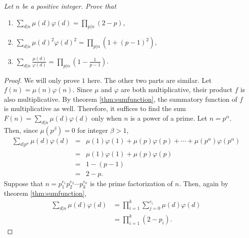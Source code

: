 \documentclass[12pt]{subfile}
\begin{document}
		\begin{theorem}\slshape
			Let $n$ be a positive integer. Prove that
			\begin{enumerate}
				\item $\displaystyle \sum_{d|n}\mu(d)\varphi(d) = \prod_{p|n} (2-p)$,
				\item $\displaystyle \sum_{d|n}\mu(d)^2\varphi(d)^2=\prod_{p|n}(1+(p-1)^2)$,
				\item $\displaystyle \sum_{d|n}\frac{\mu(d)}{\varphi(d)} = \prod_{p|n}\left(1-\frac{1}{p-1}\right)$.
			\end{enumerate}
		\end{theorem}
		
		\begin{proof}
			We will only prove $1$ here. The other two parts are similar. Let $f(n)=\mu(n)\varphi(n)$. Since $\mu$ and $\varphi$ are both multiplicative, their product $f$ is also multiplicative. By theorem \eqref{thm:sumfunction}, the summatory function of $f$ is multiplicative as well. Therefore, it suffices to find the sum $F(n)=\sum\limits_{d|n}\mu(d)\varphi(d)$ only when $n$ is a power of a prime. Let $n=p^\alpha$. Then, since $\mu(p^\beta)=0$ for integer $\beta > 1$,
				\begin{eqnarray*}
				\sum\limits_{d|p^\alpha}\mu(d)\varphi(d) 
					&=& \mu(1)\varphi(1) + \mu(p) \varphi(p) + \cdots + \mu(p^\alpha) \varphi(p^\alpha)\\
					&=& \mu(1)\varphi(1) + \mu(p) \varphi(p) \\
					&=& 1 - (p-1)\\
					&=& 2 - p.
				\end{eqnarray*}
			Suppose that $n=p_1^{e_1}p_2^{e_2} \cdots p_k^{e_k}$ is the prime factorization of $n$. Then, again by theorem \eqref{thm:sumfunction},
			\begin{align*}
			\sum\limits_{d|n}\mu(d)\varphi(d) &= \prod_{i=1}^{k}\sum\limits_{j=0}^{e_i}\mu(d)\varphi(d)\\
			&= \prod_{i=1}^{k} (2-p_i).
			\end{align*}
		\end{proof}
\end{document}
